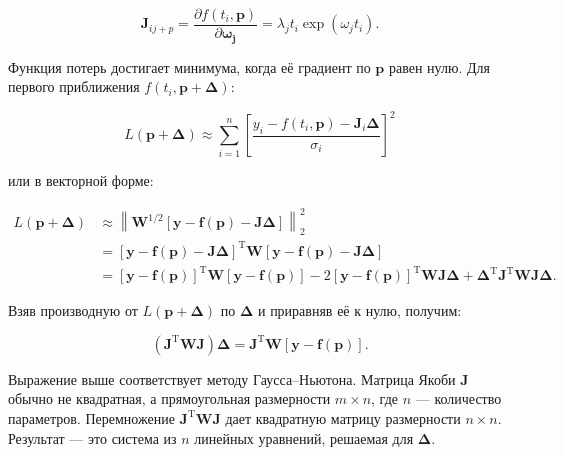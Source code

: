 $$
	\mathbf{J}_{ij+p}=\frac{\partial f\left (t_i,  \mathbf{p}\right )}{\partial  \mathbf{\omega_j}} = \lambda_jt_i\exp(\omega_jt_i).
$$

Функция потерь достигает минимума, когда её градиент по $\textbf{p}$ равен нулю. Для первого приближения $f\left (t_i,  \mathbf{p} + \boldsymbol\Delta\right )$:

$$
	L\left ( \mathbf{p} + \boldsymbol\Delta\right ) \approx \sum_{i=1}^n \left [\frac{y_i - f\left (t_i,  \mathbf{p}\right ) - \mathbf J_i \boldsymbol\Delta}{\sigma_i}\right ]^2
$$

или в векторной форме:

$$
	\begin{aligned}
		L\left ( \mathbf{p} + \boldsymbol\Delta\right ) & \approx \left \|\boldsymbol{W}^{1/2}\left [\mathbf y - \mathbf f\left ( \mathbf{p}\right ) - \mathbf J\boldsymbol\Delta\right ]\right \|_2^2                                                                                                                                                                                                                                           \\
		& = \left [\mathbf y - \mathbf f\left ( \mathbf{p}\right ) - \mathbf J\boldsymbol\Delta \right ]^{\mathrm T}\boldsymbol{W}\left [\mathbf y - \mathbf f\left ( \mathbf{p}\right ) - \mathbf J\boldsymbol\Delta\right ]                                                                                                                                                                    \\
		 & = \left [\mathbf y - \mathbf f\left ( \mathbf{p}\right )\right ]^{\mathrm T}\boldsymbol{W}\left [\mathbf y - \mathbf f\left ( \mathbf{p}\right )\right ] - 2\left [\mathbf y - \mathbf f\left ( \mathbf{p}\right )\right ]^{\mathrm T}\boldsymbol{W} \mathbf J\boldsymbol{\Delta} + \boldsymbol{\Delta}^{\mathrm T} \mathbf J^{\mathrm T} \boldsymbol{W} \mathbf J\boldsymbol{\Delta}.
	\end{aligned}
$$

Взяв производную от $L\left ( \mathbf{p} + \boldsymbol\Delta\right )$ по $\boldsymbol{\Delta}$ и приравняв её к нулю, получим:

$$
	\left (\mathbf J^{\mathrm T} \boldsymbol{W} \mathbf J \right ) \boldsymbol\Delta = \mathbf J^{\mathrm T}\boldsymbol{W}\left [\mathbf y - \mathbf f\left ( \boldsymbol p\right )\right ].
$$


Выражение выше соответствует методу Гаусса–Ньютона. Матрица Якоби $\mathbf{J}$ обычно не квадратная, а прямоугольная размерности $m \times n$, где $n$ — количество параметров. Перемножение $\mathbf J^{\mathrm T} \boldsymbol{W} \mathbf J$ дает квадратную матрицу размерности $n \times n$. Результат — это система из $n$ линейных уравнений, решаемая для $\boldsymbol{\Delta}$.

